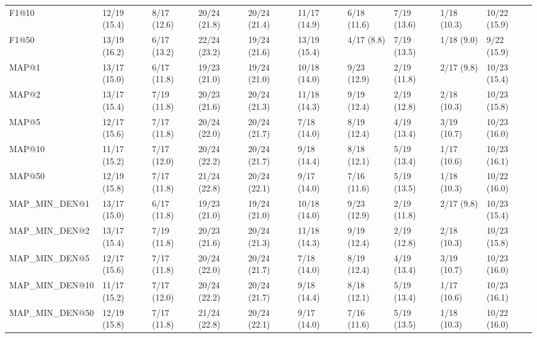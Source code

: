 \begin{tabular}{llllllllll}
F1@10                       &   12/19 (15.4) &    8/17 (12.6) &      20/24 (21.8) &   20/24 (21.4) &  11/17 (14.9) &    6/18 (11.6) &         7/19 (13.6) &  1/18 (10.3) &  10/22 (15.9) \\
F1@50                       &   13/19 (16.2) &    6/17 (13.2) &      22/24 (23.2) &   19/24 (21.6) &  13/19 (15.4) &     4/17 (8.8) &         7/19 (13.5) &   1/18 (9.0) &   9/22 (15.9) \\
MAP@1                       &   13/17 (15.0) &    6/17 (11.8) &      19/23 (21.0) &   19/24 (21.0) &  10/18 (14.0) &    9/23 (12.9) &         2/19 (11.8) &   2/17 (9.8) &  10/23 (15.4) \\
MAP@2                       &   13/17 (15.4) &    7/19 (11.8) &      20/23 (21.6) &   20/24 (21.3) &  11/18 (14.3) &    9/19 (12.4) &         2/19 (12.8) &  2/18 (10.3) &  10/23 (15.8) \\
MAP@5                       &   12/17 (15.6) &    7/17 (11.8) &      20/24 (22.0) &   20/24 (21.7) &   7/18 (14.0) &    8/19 (12.4) &         4/19 (13.4) &  3/19 (10.7) &  10/23 (16.0) \\
MAP@10                      &   11/17 (15.2) &    7/17 (12.0) &      20/24 (22.2) &   20/24 (21.7) &   9/18 (14.4) &    8/18 (12.1) &         5/19 (13.4) &  1/17 (10.6) &  10/23 (16.1) \\
MAP@50                      &   12/19 (15.8) &    7/17 (11.8) &      21/24 (22.8) &   20/24 (22.1) &   9/17 (14.0) &    7/16 (11.6) &         5/19 (13.5) &  1/18 (10.3) &  10/22 (16.0) \\
MAP_MIN_DEN@1               &   13/17 (15.0) &    6/17 (11.8) &      19/23 (21.0) &   19/24 (21.0) &  10/18 (14.0) &    9/23 (12.9) &         2/19 (11.8) &   2/17 (9.8) &  10/23 (15.4) \\
MAP_MIN_DEN@2               &   13/17 (15.4) &    7/19 (11.8) &      20/23 (21.6) &   20/24 (21.3) &  11/18 (14.3) &    9/19 (12.4) &         2/19 (12.8) &  2/18 (10.3) &  10/23 (15.8) \\
MAP_MIN_DEN@5               &   12/17 (15.6) &    7/17 (11.8) &      20/24 (22.0) &   20/24 (21.7) &   7/18 (14.0) &    8/19 (12.4) &         4/19 (13.4) &  3/19 (10.7) &  10/23 (16.0) \\
MAP_MIN_DEN@10              &   11/17 (15.2) &    7/17 (12.0) &      20/24 (22.2) &   20/24 (21.7) &   9/18 (14.4) &    8/18 (12.1) &         5/19 (13.4) &  1/17 (10.6) &  10/23 (16.1) \\
MAP_MIN_DEN@50              &   12/19 (15.8) &    7/17 (11.8) &      21/24 (22.8) &   20/24 (22.1) &   9/17 (14.0) &    7/16 (11.6) &         5/19 (13.5) &  1/18 (10.3) &  10/22 (16.0) \\

\end{tabular}

